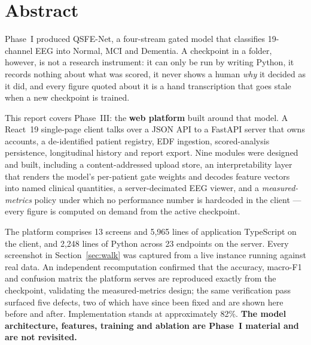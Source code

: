 \documentclass[11pt,a4paper]{article}
\begin{document}
\clearpage
\section*{Abstract}
Phase~I produced QSFE-Net, a four-stream gated model that classifies 19-channel
EEG into Normal, MCI and Dementia. A checkpoint in a folder, however, is not a
research instrument: it can only be run by writing Python, it records nothing
about what was scored, it never shows a human \emph{why} it decided as it did,
and every figure quoted about it is a hand transcription that goes stale when a
new checkpoint is trained.

This report covers Phase~III: the \textbf{web platform} built around that model.
A React~19 single-page client talks over a JSON API to a FastAPI server that
owns accounts, a de-identified patient registry, EDF ingestion, scored-analysis
persistence, longitudinal history and report export. Nine modules were designed
and built, including a content-addressed upload store, an interpretability layer
that renders the model's per-patient gate weights and decodes feature vectors
into named clinical quantities, a server-decimated EEG viewer, and a
\emph{measured-metrics} policy under which no performance number is hardcoded in
the client --- every figure is computed on demand from the active checkpoint.

The platform comprises 13 screens and 5{,}965 lines of application TypeScript on
the client, and 2{,}248 lines of Python across 23 endpoints on the server. Every
screenshot in Section~\ref{sec:walk} was captured from a live instance running
against real data. An independent recomputation confirmed that the accuracy,
macro-F1 and confusion matrix the platform serves are reproduced exactly from
the checkpoint, validating the measured-metrics design; the same verification
pass surfaced five defects, two of which have since been fixed and are shown
here before and after. Implementation stands at approximately 82\%.
\textbf{The model architecture, features, training and ablation are Phase~I
material and are not revisited.}

\vspace{4pt}\noindent{}

\vspace{2pt}
{\small\tableofcontents}
\end{document}
